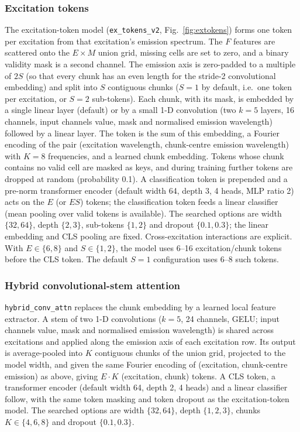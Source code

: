 \documentclass[journal]{IEEEtran}
\begin{document}
\subsubsection{Excitation tokens}\label{sec:extok}
The excitation-token model (\texttt{ex\_tokens\_v2}, Fig.~\ref{fig:extokens}) forms one token per excitation from that excitation's emission spectrum. The $F$ features are scattered onto the $E\times M$ union grid, missing cells are set to zero, and a binary validity mask is a second channel. The emission axis is zero-padded to a multiple of $2S$ (so that every chunk has an even length for the stride-2 convolutional embedding) and split into $S$ contiguous chunks ($S=1$ by default, i.e.\ one token per excitation, or $S=2$ sub-tokens). Each chunk, with its mask, is embedded by a single linear layer (default) or by a small 1-D convolution (two $k{=}5$ layers, 16 channels, input channels value, mask and normalised emission wavelength) followed by a linear layer. The token is the sum of this embedding, a Fourier encoding of the pair (excitation wavelength, chunk-centre emission wavelength) with $K{=}8$ frequencies, and a learned chunk embedding. Tokens whose chunk contains no valid cell are masked as keys, and during training further tokens are dropped at random (probability 0.1). A classification token is prepended and a pre-norm transformer encoder (default width 64, depth 3, 4 heads, MLP ratio 2) acts on the $E$ (or $ES$) tokens; the classification token feeds a linear classifier (mean pooling over valid tokens is available). The searched options are width $\{32,64\}$, depth $\{2,3\}$, sub-tokens $\{1,2\}$ and dropout $\{0.1,0.3\}$; the linear embedding and CLS pooling are fixed. Cross-excitation interactions are explicit. With $E\in\{6,8\}$ and $S\in\{1,2\}$, the model uses 6--16 excitation/chunk tokens before the CLS token. The default $S=1$ configuration uses 6--8 such tokens.

\subsubsection{Hybrid convolutional-stem attention}
\texttt{hybrid\_conv\_attn} replaces the chunk embedding by a learned local feature extractor. A stem of two 1-D convolutions ($k{=}5$, 24 channels, GELU; input channels value, mask and normalised emission wavelength) is shared across excitations and applied along the emission axis of each excitation row. Its output is average-pooled into $K$ contiguous chunks of the union grid, projected to the model width, and given the same Fourier encoding of (excitation, chunk-centre emission) as above, giving $E\cdot K$ (excitation, chunk) tokens. A CLS token, a transformer encoder (default width 64, depth 2, 4 heads) and a linear classifier follow, with the same token masking and token dropout as the excitation-token model. The searched options are width $\{32,64\}$, depth $\{1,2,3\}$, chunks $K\in\{4,6,8\}$ and dropout $\{0.1,0.3\}$.
\end{document}
